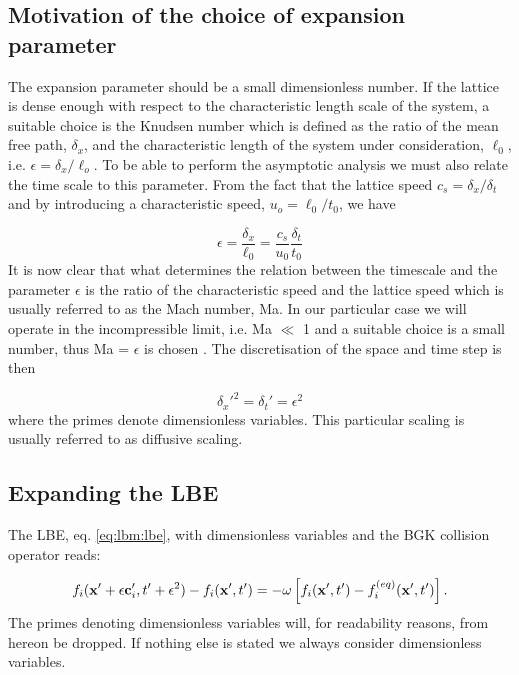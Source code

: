 \subsection{Motivation of the choice of expansion parameter}
The expansion parameter should be a small dimensionless number. If the
lattice is dense enough with respect to the characteristic length
scale of the system, a suitable choice is the Knudsen number which is
defined as the ratio of the mean free path, $\delta_x$, and the
characteristic length of the system under consideration, $\ell_0$,
i.e. $\epsilon = \delta_x /\ell_o$. To be able to perform the
asymptotic analysis we must also relate the time scale to this
parameter. From the fact that the lattice speed $c_s =
\delta_x/\delta_t$ and by introducing a characteristic speed, $u_o =
\ell_0/t_0$, we have

\begin{equation}\label{eq:lbm:rel}
\epsilon = \frac{\delta_x}{\ell_0} = \frac{c_s}{u_0}\frac{\delta_t}{t_0}
\end{equation}
It is now clear that what determines the relation between the
timescale and the parameter $\epsilon$ is the ratio of the
characteristic speed and the lattice speed which is usually referred
to as the Mach number, Ma. In our particular case we will operate in
the incompressible limit, i.e. Ma $\ll$ 1 and a suitable choice is a
small number, thus Ma = $\epsilon$ is chosen \cite{junk-boundary}. The
discretisation of the space and time step is then

\begin{equation}
\delta_x'^2 = \delta_t' = \epsilon^2
\end{equation}
where the primes denote dimensionless variables. This particular
scaling is usually referred to as diffusive scaling.

\subsection{Expanding the LBE}
The LBE, eq. \eqref{eq:lbm:lbe}, with dimensionless variables and the
BGK collision operator reads:

\begin{equation}\label{eq:lbm:nodim_lbe}
f_i(\mathbf{x}' + \epsilon \mathbf{c}_i', t' + \epsilon^2) - f_i(\mathbf{x}', t') = -\omega \left[
  f_i(\mathbf{x}', t') - f_i^{(eq)}(\mathbf{x}', t') \right].
\end{equation} 
The primes denoting dimensionless variables will, for readability
reasons, from hereon be dropped. If nothing else is stated we always
consider dimensionless variables.

